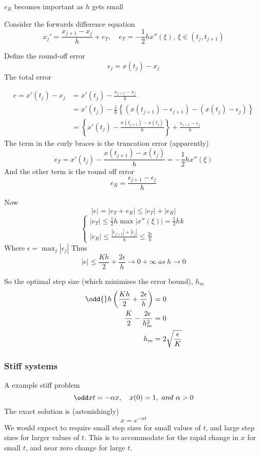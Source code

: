 \documentclass{X:/Documents/Coding/Latex/myassignment}
\begin{document}
$e_R$ becomes important as $h$ gets small

Consider the forwards difference equation
\[x_j' = \frac{x_{j+1} - x_{j}}{h} + e_T, \quad e_T = -\frac12 hx''(\xi), \ \xi \in (t_j,t_{j+1})\]

Define the round-off error 
\[\epsilon_j = x(t_j) - x_j\]
The total error

\begin{align*}
    e = x'(t_j) - x_j &= x'(t_j) - \frac{x_{j+1} - x_{j}}{h}\\
    &= x'(t_j) - \frac1h\left\{(x(t_{j+1}) - \epsilon_{j+1}) - (x(t_j) - \epsilon_j)\right\}\\
    &=\left\{x'(t_j) - \frac{x(t_{j+1}) - x(t_j)}h\right\} + \frac{\epsilon_{j+1} - \epsilon_j}{h}
\end{align*}
The term in the curly braces is the truncation error (apparently)
\[e_T = x'(t_j) - \frac{x(t_{j+1}) - x(t_j)}h=-\frac12 h x''(\xi)\]
And the other term is the round off error
\[e_R = \frac{\epsilon_{j+1} - \epsilon_j}{h}\]

Now
\[|e| = |e_T + e_R| \leq |e_T| + |e_R|\]
\[
    \begin{cases}
        |e_T| \leq \frac12 h \max|x''(\xi)| = \frac12 h k\\
        |e_R| \leq \frac{|\epsilon_{j+1}|+|\epsilon_{j}|}{h} \leq \frac{2\epsilon}{h}
    \end{cases}
\]
Where $\epsilon = \max_j|\epsilon_{j}|$
Thus
\[|e| \leq \frac{Kh}{2} + \frac{2\epsilon}{h} \to 0 + \infty \ as \ h\to0\]

So the optimal step size (which minimises the error bound), $h_m$
\begin{align*}
    \odd{}h\left( \frac{Kh}{2} + \frac{2\epsilon}{h}\right) &=0\\
    \frac K2 - \frac{2\epsilon}{h_m^2} &= 0\\
    h_m &= 2\sqrt{\frac{\epsilon}{K}}
\end{align*}

\subsubsection{Stiff systems}
A example stiff problem 
\[\odd xt = -\alpha x, \quad x(0) = 1,\ and\ \alpha>0\]
The exact solution is (astonishingly)
\[x = e^{-\alpha t}\]
We would expect to require small step sizes for small values of $t$, and large step sizes for larger values of $t$. This is to accommodate for the rapid change in $x$ for small $t$, and near zero change for large $t$. 
\end{document}
